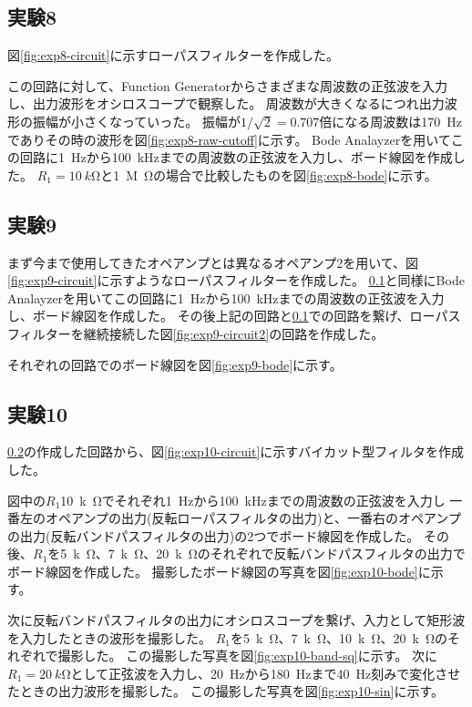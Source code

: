 \documentclass[../../../main]{subfiles}
\begin{document}
\subsection{実験8}\label{subsec:exp8}
図\ref{fig:exp8-circuit}に示すローパスフィルターを作成した。

この回路に対して、Function Generatorからさまざまな周波数の正弦波を入力し、出力波形をオシロスコープで観察した。
周波数が大きくなるにつれ出力波形の振幅が小さくなっていった。
振幅が$1/\sqrt{2}=0.707$倍になる周波数は\SI{170}{Hz}でありその時の波形を図\ref{fig:exp8-raw-cutoff}に示す。
Bode Analayzerを用いてこの回路に\SI{1}{Hz}から\SI{100}{kHz}までの周波数の正弦波を入力し、ボード線図を作成した。
$R_1=\SI{10}{k\ohm}$と\SI{1}{M\ohm}の場合で比較したものを図\ref{fig:exp8-bode}に示す。

\subsection{実験9}\label{subsec:exp9}
まず今まで使用してきたオペアンプとは異なるオペアンプ2を用いて、図\ref{fig:exp9-circuit}に示すようなローパスフィルターを作成した。
\ref{subsec:exp8}と同様にBode Analayzerを用いてこの回路に\SI{1}{Hz}から\SI{100}{kHz}までの周波数の正弦波を入力し、ボード線図を作成した。
その後上記の回路と\ref{subsec:exp8}での回路を繋げ、ローパスフィルターを継続接続した図\ref{fig:exp9-circuit2}の回路を作成した。

それぞれの回路でのボード線図を図\ref{fig:exp9-bode}に示す。

\subsection{実験10}
\ref{subsec:exp9}の作成した回路から、図\ref{fig:exp10-circuit}に示すバイカット型フィルタを作成した。

図中の$R_1$\SI{10}{k\ohm}でそれぞれ\SI{1}{Hz}から\SI{100}{kHz}までの周波数の正弦波を入力し
一番左のオペアンプの出力(反転ローパスフィルタの出力)と、一番右のオペアンプの出力(反転バンドパスフィルタの出力)の2つでボード線図を作成した。
その後、$R_1$を\SI{5}{k\ohm}、\SI{7}{k\ohm}、\SI{20}{k\ohm}のそれぞれで反転バンドパスフィルタの出力でボード線図を作成した。
撮影したボード線図の写真を図\ref{fig:exp10-bode}に示す。

次に反転バンドパスフィルタの出力にオシロスコープを繋げ、入力として矩形波を入力したときの波形を撮影した。
$R_1$を\SI{5}{k\ohm}、\SI{7}{k\ohm}、\SI{10}{k\ohm}、\SI{20}{k\ohm}のそれぞれで撮影した。
この撮影した写真を図\ref{fig:exp10-band-sq}に示す。
次に$R_1=\SI{20}{k\ohm}$として正弦波を入力し、\SI{20}{Hz}から\SI{180}{Hz}まで\SI{40}{Hz}刻みで変化させたときの出力波形を撮影した。
この撮影した写真を図\ref{fig:exp10-sin}に示す。
\end{document}
